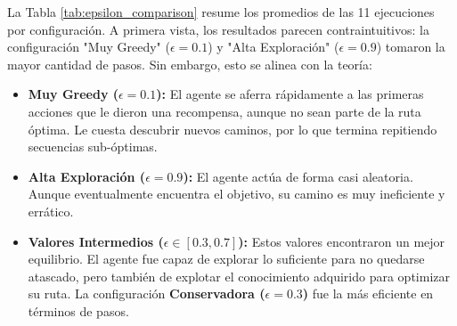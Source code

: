 \documentclass[12pt, oneside, openany]{book}
\begin{document}


La Tabla \ref{tab:epsilon_comparison} resume los promedios de las 11 ejecuciones por configuración. A primera vista, los resultados parecen contraintuitivos: la configuración "Muy Greedy" ($\epsilon=0.1$) y "Alta Exploración" ($\epsilon=0.9$) tomaron la mayor cantidad de pasos. Sin embargo, esto se alinea con la teoría:
\begin{itemize}
    \item \textbf{Muy Greedy ($\epsilon=0.1$):} El agente se aferra rápidamente a las primeras acciones que le dieron una recompensa, aunque no sean parte de la ruta óptima. Le cuesta descubrir nuevos caminos, por lo que termina repitiendo secuencias sub-óptimas.
    \item \textbf{Alta Exploración ($\epsilon=0.9$):} El agente actúa de forma casi aleatoria. Aunque eventualmente encuentra el objetivo, su camino es muy ineficiente y errático.
    \item \textbf{Valores Intermedios ($\epsilon \in [0.3, 0.7]$):} Estos valores encontraron un mejor equilibrio. El agente fue capaz de explorar lo suficiente para no quedarse atascado, pero también de explotar el conocimiento adquirido para optimizar su ruta. La configuración \textbf{Conservadora ($\epsilon=0.3$)} fue la más eficiente en términos de pasos.
\end{itemize}
\end{document}
